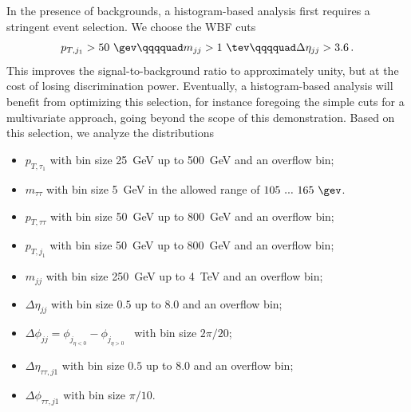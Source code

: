 In the presence of backgrounds, a histogram-based analysis first
requires a stringent event selection. We choose the WBF cuts 
%
\begin{align}
  p_{T,j_1} > 50~\gev \qqqquad
  m_{jj} > 1~\tev \qqqquad
  \Delta \eta_{jj} > 3.6 \,.
  \label{eq:wbf_tautau_wbfcuts}
\end{align}
%
This improves the signal-to-background ratio to approximately unity,
but at the cost of losing discrimination power. Eventually, a
histogram-based analysis will benefit from optimizing this selection,
for instance foregoing the simple cuts for a multivariate approach,
going beyond the scope of this demonstration.  Based on this
selection, we analyze the distributions
%
\begin{itemize}[label=\raisebox{0.1ex}{\scriptsize$\bullet$}]
\item $p_{T,\tau_1}$ with bin size 25~GeV up to 500~GeV and an
  overflow bin;
\item $m_{\tau \tau}$ with bin size 5~GeV in the allowed range of
  $105~...~165~\gev$.
\item $p_{T,\tau \tau}$ with bin size 50~GeV up to 800~GeV and an
  overflow bin;
\item $p_{T,j_1}$ with bin size 50~GeV up to 800~GeV and an
  overflow bin;
\item $m_{jj}$ with bin size 250~GeV up to 4~TeV and an overflow
  bin;
\item $\Delta \eta_{jj}$ with bin size $0.5$ up to $8.0$ and an
  overflow bin;
\item $\Delta \phi_{jj} = \phi_{j_{\eta < 0}} - \phi_{j_{\eta > 0}}$~\cite{phi_jjs} with bin size $2 \pi / 20$;
\item $\Delta \eta_{\tau\tau, j1}$ with bin size $0.5$ up to $8.0$ and an
  overflow bin;
\item $\Delta \phi_{\tau \tau, j1}$ with bin size $\pi / 10$.
\end{itemize} \bigskip 

